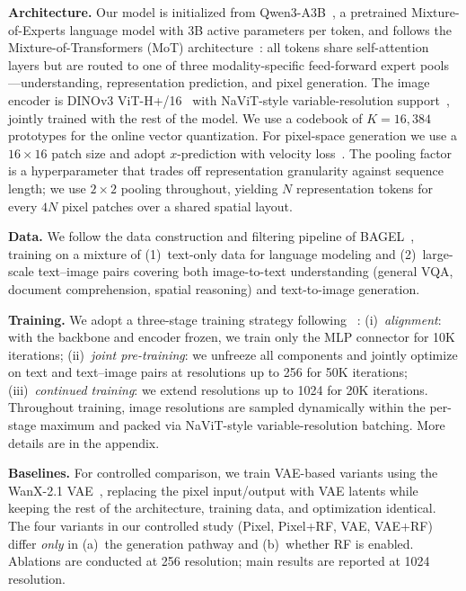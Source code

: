 \textbf{Architecture.}
Our model is initialized from Qwen3-A3B~\cite{qwen3}, a pretrained Mixture-of-Experts language model with 3B active parameters per token, and follows the Mixture-of-Transformers (MoT) architecture~\cite{bagel}: all tokens share self-attention layers but are routed to one of three modality-specific feed-forward expert pools---understanding, representation prediction, and pixel generation. The image encoder is DINOv3 ViT-H+/16~\cite{dinov3} with NaViT-style variable-resolution support~\cite{navit}, jointly trained with the rest of the model. We use a codebook of $K{=}16{,}384$ prototypes for the online vector quantization. For pixel-space generation we use a $16{\times}16$ patch size and adopt $x$-prediction with velocity loss~\cite{jit}. The pooling factor is a hyperparameter that trades off representation granularity against sequence length; we use $2{\times}2$ pooling throughout, yielding $N$ representation tokens for every $4N$ pixel patches over a shared spatial layout.



\textbf{Data.}
We follow the data construction and filtering pipeline of BAGEL~\cite{bagel}, training on a mixture of (1)~text-only data for language modeling and (2)~large-scale text--image pairs covering both image-to-text understanding (general VQA, document comprehension, spatial reasoning) and text-to-image generation.

\textbf{Training.}
We adopt a three-stage training strategy following ~\cite{bagel}: (i)~\emph{alignment}: with the backbone and encoder frozen, we train only the MLP connector for 10K iterations; (ii)~\emph{joint pre-training}: we unfreeze all components and jointly optimize on text and text--image pairs at resolutions up to 256 for 50K iterations; (iii)~\emph{continued training}: we extend resolutions up to 1024 for 20K iterations. Throughout training, image resolutions are sampled dynamically within the per-stage maximum and packed via NaViT-style variable-resolution batching.  More details are in the appendix.




\textbf{Baselines.}
For controlled comparison, we train VAE-based variants using the WanX-2.1 VAE~\cite{wanx}, replacing the pixel input/output with VAE latents while keeping the rest of the architecture, training data, and optimization identical. The four variants in our controlled study (Pixel, Pixel+RF, VAE, VAE+RF) differ \emph{only} in (a)~the generation pathway and (b)~whether RF is enabled. Ablations are conducted at 256 resolution; main results are reported at 1024 resolution.

